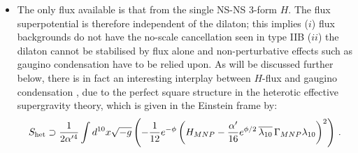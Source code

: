 \begin{itemize}
\item The only flux available is that from the single NS-NS 3-form $H$.  The flux superpotential is therefore independent of the dilaton; this implies ($i$) flux backgrounds do not have the no-scale cancellation seen in type IIB ($ii$) the dilaton cannot be stabilised by flux alone and non-perturbative effects such as gaugino condensation have to be relied upon.  As will be discussed further below, there is in fact an interesting interplay between $H$-flux and gaugino condensation \cite{Dine:1985rz, Derendinger:1985kk}, due to the perfect square structure in the heterotic effective supergravity theory, which is given in the Einstein frame by:
\begin{equation}
S_{\rm het} \supset \frac{1}{2\alpha'^4}\int d^{10}x\sqrt{-g}\left(-\frac{1}{12}e^{-\phi}\left(H_{MNP}-\frac{\alpha'}{16}e^{\phi/2}\,\overline{\lambda_{10}}\,\Gamma_{MNP}\lambda_{10} \right)^2\right)\,. 
\label{E:perfectsquare}
\end{equation}


\end{itemize}
